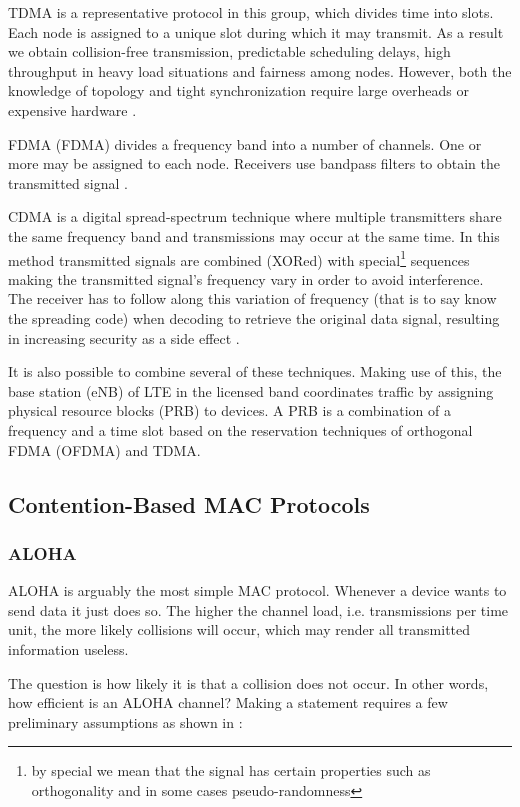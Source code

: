 TDMA is a representative protocol in this group, which divides time into slots. Each node is assigned to a unique slot during which it may transmit. As a result we obtain collision-free transmission, predictable scheduling delays, high throughput in heavy load situations and fairness among nodes. However, both the knowledge of topology and tight synchronization require large overheads or expensive hardware \cite{Bachir10}.

FDMA (FDMA) divides a frequency band into a number of channels. One or more may be assigned to each node. Receivers use bandpass filters to obtain the transmitted signal \cite{Garg07}.

CDMA is a digital spread-spectrum technique where multiple transmitters share the same frequency band and transmissions may occur at the same time. In this method transmitted signals are combined (XORed) with special\footnote{by special we mean that the signal has certain properties such as orthogonality and in some cases pseudo-randomness} sequences making the transmitted signal's frequency vary in order to avoid interference. The receiver has to follow along this variation of frequency (that is to say know the spreading code) when decoding to retrieve the original data signal, resulting in increasing security as a side effect \cite{Garg07}.

It is also possible to combine several of these techniques. Making use of this, the base station (eNB) of LTE in the licensed band coordinates traffic by assigning physical resource blocks (PRB) to devices. A PRB is a combination of a frequency and a time slot based on the reservation techniques of orthogonal FDMA (OFDMA) and TDMA. 

\subsection{Contention-Based MAC Protocols}
\subsubsection{ALOHA}
\label{sec:aloha}

ALOHA is arguably the most simple MAC protocol. Whenever a device wants to send data it just does so. The higher the channel load, i.e. transmissions per time unit, the more likely collisions will occur, which may render all transmitted information useless.

The question is how likely it is that a collision does not occur. In other words, how efficient is an ALOHA channel? Making a statement requires a few preliminary assumptions as shown in \cite{Tanenbaum02}:

